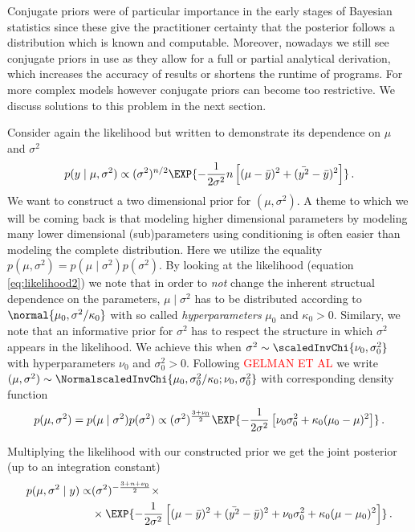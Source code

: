 Conjugate priors were of particular importance in the early stages of Bayesian statistics since these give the practitioner certainty that the posterior follows a distribution which is known and computable. Moreover, nowadays we still see conjugate priors in use as they allow for a full or partial analytical derivation, which increases the accuracy of results or shortens the runtime of programs. For more complex models however conjugate priors can become too restrictive. We discuss solutions to this problem in the next section.

Consider again the likelihood but written to demonstrate its dependence on $\mu$ and $\sigma^2$
\begin{align}
  p(y \mid \mu, \sigma^2) \propto (\sigma^2)^{n/2} \EXP{-\frac{1}{2\sigma^2} n\left[ (\mu - \bar{y})^2 + (\bar{y^2} - \bar{y})^2 \right]} \,.
  \label{eq:likelihood2}
\end{align}
We want to construct a two dimensional prior for $(\mu, \sigma^2)$.
A theme to which we will be coming back is that modeling higher dimensional parameters by modeling many lower dimensional (sub)parameters using conditioning is often easier than modeling the complete distribution.
Here we utilize the equality $p(\mu, \sigma^2) = p(\mu \mid \sigma^2) p(\sigma^2)$.
By looking at the likelihood (equation \ref{eq:likelihood2}) we note that in order to \emph{not} change the inherent structual dependence on the parameters, $\mu \mid \sigma^2$ has to be distributed according to $\normal{\mu_0, \sigma^2 / \kappa_0}$ with so called \emph{hyperparameters} $\mu_0$ and $\kappa_0 > 0$.
Similary, we note that an informative prior for $\sigma^2$ has to respect the structure in which $\sigma^2$ appears in the likelihood.
We achieve this when $\sigma^2 \sim \scaledInvChi{\nu_0, \sigma_0^2}$ with hyperparameters $\nu_0$ and $\sigma_0^2 > 0$.
Following \textcolor{red}{GELMAN ET AL} we write $(\mu, \sigma^2) \sim \NormalscaledInvChi{\mu_0, \sigma_0^2 / \kappa_0; \nu_0, \sigma_0^2}$ with corresponding density function
\begin{align}
  p(\mu, \sigma^2) = p(\mu \mid \sigma^2) p(\sigma^2) \propto (\sigma^2)^{\frac{3 + \nu_0}{2}} \EXP{-\frac{1}{2\sigma^2} \left[\nu_0 \sigma_0^2 + \kappa_0(\mu_0 - \mu)^2 \right]} \,.
\end{align}

Multiplying the likelihood with our constructed prior we get the joint posterior (up to an integration constant)
\begin{align}
  p(\mu, \sigma^2 \mid y) \propto& (\sigma^2)^{-\frac{3 + n + \nu_0}{2}} \times\\
  & \times \EXP{-\frac{1}{2 \sigma^2} \left[ (\mu - \bar{y})^2 + (\bar{y^2} - \bar{y})^2 + \nu_0\sigma_0^2 + \kappa_0(\mu - \mu_0)^2 \right]} \,.
  \label{eq:conjugate_posterior}
\end{align}

